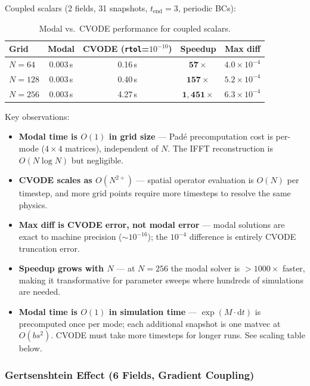 Coupled scalars (2 fields, 31 snapshots, $t_\text{end}=3$, periodic BCs):

\begin{table}[htbp]
\centering
\caption{Modal vs.\ CVODE performance for coupled scalars.}
\label{tab:modal-coupled-perf}
\begin{tabular}{@{}lcccc@{}}
\toprule
Grid & Modal & CVODE (\texttt{rtol}=$10^{-10}$) & Speedup & Max diff \\
\midrule
$N=64$ & 0.003\,s & 0.16\,s & $\mathbf{57\times}$ & $4.0\times 10^{-4}$ \\
$N=128$ & 0.003\,s & 0.40\,s & $\mathbf{157\times}$ & $5.2\times 10^{-4}$ \\
$N=256$ & 0.003\,s & 4.27\,s & $\mathbf{1{,}451\times}$ & $6.3\times 10^{-4}$ \\
\bottomrule
\end{tabular}
\end{table}

Key observations:
\begin{itemize}
  \item \textbf{Modal time is $O(1)$ in grid size} --- Pad\'{e} precomputation cost is per-mode ($4\times 4$ matrices), independent of $N$. The IFFT reconstruction is $O(N \log N)$ but negligible.
  \item \textbf{CVODE scales as $O(N^{2+})$} --- spatial operator evaluation is $O(N)$ per timestep, and more grid points require more timesteps to resolve the same physics.
  \item \textbf{Max diff is CVODE error, not modal error} --- modal solutions are exact to machine precision (${\sim}10^{-16}$); the $10^{-4}$ difference is entirely CVODE truncation error.
  \item \textbf{Speedup grows with $N$} --- at $N=256$ the modal solver is ${>}1000\times$ faster, making it transformative for parameter sweeps where hundreds of simulations are needed.
  \item \textbf{Modal time is $O(1)$ in simulation time} --- $\exp(M \cdot \mathrm{d}t)$ is precomputed once per mode; each additional snapshot is one matvec at $O(bs^2)$. CVODE must take more timesteps for longer runs. See scaling table below.
\end{itemize}

\subsubsection{Gertsenshtein Effect (6 Fields, Gradient Coupling)}
\label{sec:modal-gertsenshtein-bench}

